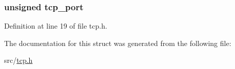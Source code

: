 \subsubsection[{tcp\+\_\+port}]{\setlength{\rightskip}{0pt plus 5cm}unsigned tcp\+\_\+port}\label{structtcp__handle_a9c359bbbf5b11a9dc290584ddbbb333e}


Definition at line 19 of file tcp.\+h.



The documentation for this struct was generated from the following file\+:\begin{DoxyCompactItemize}
\item 
src/\hyperlink{tcp_8h}{tcp.\+h}\end{DoxyCompactItemize}
